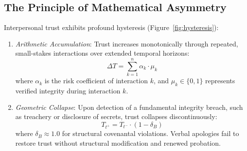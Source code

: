 \documentclass[11pt,twocolumn]{article}
\begin{document}
\subsection{The Principle of Mathematical Asymmetry}
Interpersonal trust exhibits profound hysteresis (Figure~\ref{fig:hysteresis}):
\begin{enumerate}
    \item \textit{Arithmetic Accumulation}: Trust increases monotonically through repeated, small-stakes interactions over extended temporal horizons:
    \begin{equation}
        \Delta T = \sum_{k=1}^n \alpha_k \cdot \mu_k
    \end{equation}
    where $\alpha_k$ is the risk coefficient of interaction $k$, and $\mu_k \in \{0, 1\}$ represents verified integrity during interaction $k$.
    \item \textit{Geometric Collapse}: Upon detection of a fundamental integrity breach, such as treachery or disclosure of secrets, trust collapses discontinuously:
    \begin{equation}
        T_{t^+} = T_{t^-} \cdot (1 - \delta_B)
    \end{equation}
    where $\delta_B \approx 1.0$ for structural covenantal violations. Verbal apologies fail to restore trust without structural modification and renewed probation.
\end{enumerate}
\end{document}
